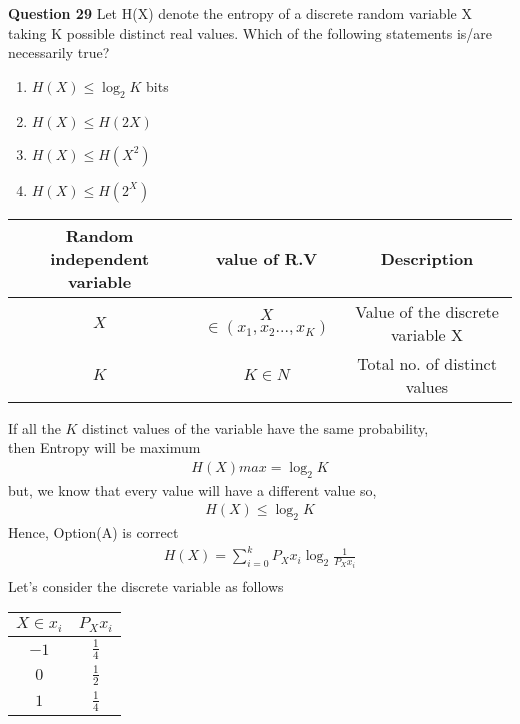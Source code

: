 \documentclass[journal,12pt,onecolumn]{IEEEtran}
\theoremstyle{remark}
\begin{document}
%
\textbf{Question 29}
Let H(X) denote the entropy of a discrete
random variable X taking K possible distinct
real values. Which of the following statements
is/are necessarily true?
\begin{enumerate}[label=(\Alph*)]
\item 
$H(X)\leq \log _{2} K$ bits\\
\item 
$H(X) \leq H(2X)$\\
\item
$H(X)\leq H(X^2)$\\
\item
$H(X) \leq H(2^X)$\\
\end{enumerate}
\solution
\begin{table}[htpb]
\centering 
\begin{tabular}{|c|c|c|}
\hline
Random independent variable	&	value	of R.V		   &Description\\
\hline
$X$                         & $X$ $\in(x_1,x_2 ... ,x_K)$                                & Value of the discrete variable X\\
\hline
$K$	        	& $K \in N$		     & Total no. of distinct values\\
\hline
\end{tabular}
\end{table}
If all the $K$ distinct values of the variable have the same probability,\\
 then Entropy will be maximum 
 \begin{align}
 H(X)max = \log _{2}K 
 \end{align}
 but, we know that every value will have a different value so,
 \begin{align}
 H(X) \leq \log _{2}K 
 \end{align}
 Hence, Option(A) is correct
 \begin{align}
 H(X) = \sum_{i=0}^{k}P_X{x_i} \log _{2} \frac{1}{P_X{x_i}}\\
 \end{align}
 Let's consider the discrete variable as follows
 \begin{table}[htpb]
\centering 
\begin{tabular}{|c|c|}
\hline
$X \in x_i$	&	$P_X{x_i}$\\
\hline
$-1$                         & $\frac{1}{4} $ \\
\hline
$0$                         & $\frac{1}{2}$  \\
\hline
$1$                         & $\frac{1}{4} $ \\
\hline
\end{tabular}
\end{table}
\end{document}
